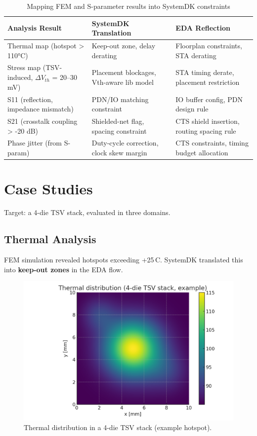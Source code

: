 \documentclass[conference]{IEEEtran}
\begin{document}
\begin{table}[htbp]
\centering
\caption{Mapping FEM and S-parameter results into SystemDK constraints}
\begin{tabular}{|l|l|l|}
\hline
\textbf{Analysis Result} & \textbf{SystemDK Translation} & \textbf{EDA Reflection} \\ \hline
Thermal map (hotspot > 110°C) & Keep-out zone, delay derating & Floorplan constraints, STA derating \\ \hline
Stress map (TSV-induced, $\Delta V_{th}$ = 20--30 mV) & Placement blockages, Vth-aware lib model & STA timing derate, placement restriction \\ \hline
S11 (reflection, impedance mismatch) & PDN/IO matching constraint & IO buffer config, PDN design rule \\ \hline
S21 (crosstalk coupling > -20 dB) & Shielded-net flag, spacing constraint & CTS shield insertion, routing spacing rule \\ \hline
Phase jitter (from S-param) & Duty-cycle correction, clock skew margin & CTS constraints, timing budget allocation \\ \hline
\end{tabular}
\label{tab:mapping}
\end{table}

\section{Case Studies}
Target: a 4-die TSV stack, evaluated in three domains.

\subsection{Thermal Analysis}
FEM simulation revealed hotspots exceeding +25\,\textdegree C.
SystemDK translated this into \textbf{keep-out zones} in the EDA flow.

\begin{figure}[htbp]
  \centering
  \includegraphics[width=0.8\linewidth]{thermal_map}
  \caption{Thermal distribution in a 4-die TSV stack (example hotspot).}
  \label{fig:thermal}
\end{figure}
\end{document}
